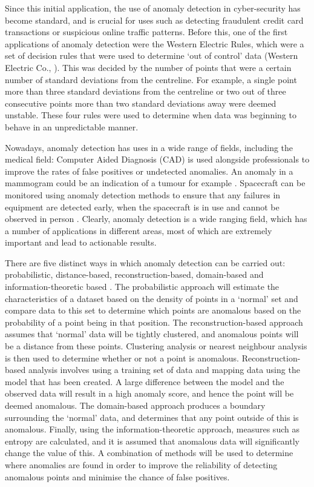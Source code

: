 Since this initial application, the use of anomaly detection in cyber-security has become standard, and is crucial for uses such as detecting fraudulent credit card transactions or suspicious online traffic patterns. Before this, one of the first applications of anomaly detection were the Western Electric Rules, which were a set of decision rules that were used to determine `out of control' data (Western Electric Co., \citeyear{statistical_quality_control_handbook_1956}). This was decided by the number of points that were a certain number of standard deviations from the centreline. For example, a single point more than three standard deviations from the centreline or two out of three consecutive points more than two standard deviations away were deemed unstable. These four rules were used to determine when data was beginning to behave in an unpredictable manner. 

Nowadays, anomaly detection has uses in a wide range of fields, including the medical field: Computer Aided Diagnosis (CAD) is used alongside professionals to improve the rates of false positives or undetected anomalies. An anomaly in a mammogram could be an indication of a tumour for example \cite{Sajda2003AMP}. Spacecraft can be monitored using anomaly detection methods to ensure that any failures in equipment are detected early, when the spacecraft is in use and cannot be observed in person \cite{Fujimaki:2005:ADM:2140831.2140938}. Clearly, anomaly detection is a wide ranging field, which has a number of applications in different areas, most of which are extremely important and lead to actionable results.

There are five distinct ways in which anomaly detection can be carried out: probabilistic, distance-based, reconstruction-based, domain-based and information-theoretic based \cite{Pimentel2014215}. The probabilistic approach will estimate the characteristics of a dataset based on the density of points in a `normal' set and compare data to this set to determine which points are anomalous based on the probability of a point being in that position. The reconstruction-based approach assumes that `normal' data will be tightly clustered, and anomalous points will be a distance from these points. Clustering analysis or nearest neighbour analysis is then used to determine whether or not a point is anomalous. Reconstruction-based analysis involves using a training set of data and mapping data using the model that has been created. A large difference between the model and the observed data will result in a high anomaly score, and hence the point will be deemed anomalous. The domain-based approach produces a boundary surrounding the `normal' data, and determines that any point outside of this is anomalous. Finally, using the information-theoretic approach, measures such as entropy are calculated, and it is assumed that anomalous data will significantly change the value of this. A combination of methods will be used to determine where anomalies are found in order to improve the reliability of detecting anomalous points and minimise the chance of false positives.

